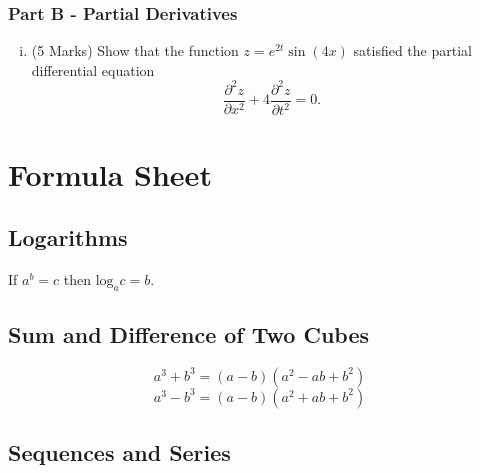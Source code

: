 \documentclass[a4paper,12pt]{article}
\begin{document}
\bigskip
\subsubsection*{Part B - Partial Derivatives}
\begin{enumerate}[(i)]

 \item (5 Marks)
 Show that the function $z=e^{2t}\sin(4x)$ satisfied the partial differential equation
 \[ \frac{\partial^2 z}{\partial x^2} +  4\frac{\partial^2 z}{\partial t^2} = 0. \]
\end{enumerate}
%
%	
%
%
%

\newpage
	
	\section*{Formula Sheet}
	
	\subsection*{Logarithms}
	If $a^b = c$ then $\mbox{log}_a c = b$.
	\subsection*{Sum and Difference of Two Cubes}
	\[ a^3 + b^3 = (a-b)(a^2 - ab + b^2)\]
	\[ a^3 - b^3 = (a-b)(a^2 + ab + b^2)\]
	
	
	\subsection*{Sequences and Series}
	
\end{document}
